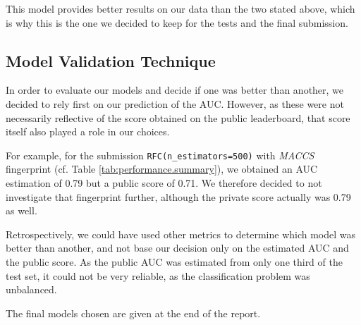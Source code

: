 This model provides better results on our data than the two stated above, which is why this is the one we decided to keep for the tests and the final submission.

\subsection{Model Validation Technique}

In order to evaluate our models and decide if one was better than another, we decided to rely first on our prediction of the AUC. However, as these were not necessarily reflective of the score obtained on the public leaderboard, that score itself also played a role in our choices.

For example, for the submission \texttt{RFC(n\_estimators=500)} with \textit{MACCS} fingerprint (cf. Table \ref{tab:performance.summary}), we obtained an AUC estimation of \num{0.79} but a public score of \num{0.71}. We therefore decided to not investigate that fingerprint further, although the private score actually was \num{0.79} as well.

Retrospectively, we could have used other metrics to determine which model was better than another, and not base our decision only on the estimated AUC and the public score. As the public AUC was estimated from only one third of the test set, it could not be very reliable, as the classification problem was unbalanced.

The final models chosen are given at the end of the report.
